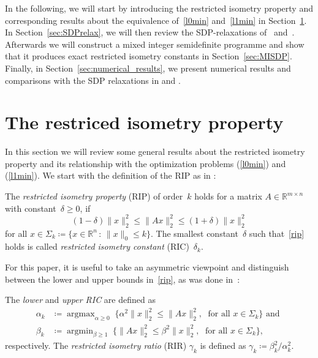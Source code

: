 \documentclass[a4paper,11pt,1p]{elsarticle}
\DeclareMathOperator*{\argmin}{argmin}
\DeclareMathOperator*{\argmax}{argmax}
\newcommand{\suchthat}{\,:\,}
\newcommand{\define}{\coloneqq}
\newcommand{\Norm}[2]{\lVert{#1}\rVert_{#2}}
\newcommand{\R}{\mathds{R}}
\begin{document}
In the following, we will start by introducing the restricted isometry
property and corresponding results about the equivalence of~\eqref{l0min}
and~\eqref{l1min} in Section~\ref{sec:RIP}. In Section~\ref{sec:SDPrelax},
we will then review the SDP-relaxations of~\cite{Asp07}
and~\cite{Asp08}. Afterwards we will construct a mixed integer semidefinite
programme and show that it produces exact restricted isometry constants in
Section~\ref{sec:MISDP}. Finally, in Section~\ref{sec:numerical_results},
we present numerical results and comparisons with the SDP relaxations in
\cite{Asp07} and \cite{Asp08}.

\section{The restriced isometry property}
\label{sec:RIP}

In this section we will review some general results about the restricted
isometry property and its relationship with the optimization problems
(\ref{l0min}) and (\ref{l1min}). We start with the definition of the RIP as
in \cite{CT05}:

\begin{rmk}\label{ripdef}
  The \emph{restricted isometry property} (RIP) of order~$k$ holds for a
  matrix $A \in \R^{m \times n}$ with constant~$\delta \geq 0$, if
  \begin{equation}\label{rip}
    (1 - \delta) \Norm{x}{2}^2 \leq \Norm{Ax}{2}^2 \leq (1+\delta) \Norm{x}{2}^2
  \end{equation}
  for all $x \in \Sigma_k \define \{x \in \R^n \suchthat \Norm{x}{0} \leq k\}$. The
  smallest constant~$\delta$ such that~\eqref{rip} holds is called
  \emph{restricted isometry constant} (RIC)~$\delta_k$.
\end{rmk}

For this paper, it is useful to take an asymmetric viewpoint and
distinguish between the lower and upper bounds in~\eqref{rip}, as was done
in~\cite{FL09}:

\begin{rmk}\label{asymRIPdef}
 The \emph{lower} and \emph{upper RIC} are defined as
 \begin{align}
   \alpha_k & \define \argmax_{\alpha \geq 0}\; \{ \alpha^2 \Norm{x}{2}^2
   \leq \Norm{Ax}{2}^2,\; \text{ for all }x \in \Sigma_k\}\text{ and }\label{lowerRIP}\\
   \beta_k & \define \argmin_{\beta \geq 1}\; \{ \Norm{Ax}{2}^2 \leq \beta^2
   \Norm{x}{2}^2,\; \text{ for all }x \in \Sigma_k\},\label{upperRIP}
 \end{align}
 respectively. The \emph{restricted isometry ratio} (RIR) $\gamma_k$ is
 defined as $\gamma_k \define \beta_k^2 / \alpha_k^2$.
\end{rmk}
\end{document}
